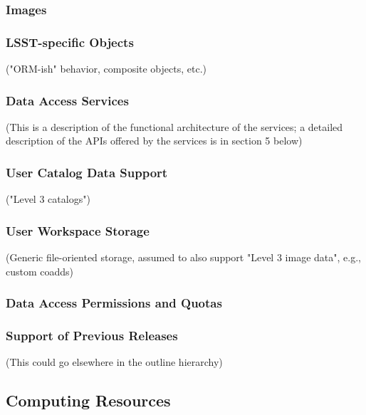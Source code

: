 \subsubsection{Images}\label{images}

\subsubsection{LSST-specific Objects}\label{lsst-specific-objects}

("ORM-ish" behavior, composite objects, etc.)

\subsubsection{Data Access Services}\label{data-access-services}

(This is a description of the functional architecture of the services; a detailed description of the APIs offered by the services is in section 5 below)

\subsubsection{User Catalog Data Support}\label{user-catalog-data-support}

("Level 3 catalogs")

\subsubsection{User Workspace Storage}\label{user-workspace-storage}

(Generic file-oriented storage, assumed to also support "Level 3 image data", e.g., custom coadds)

\subsubsection{Data Access Permissions and Quotas}\label{data-access-permissions-and-quotas}

\subsubsection{Support of Previous Releases}\label{support-of-previous-releases}

(This could go elsewhere in the outline hierarchy)

\subsection{Computing Resources}\label{computing-resources}

